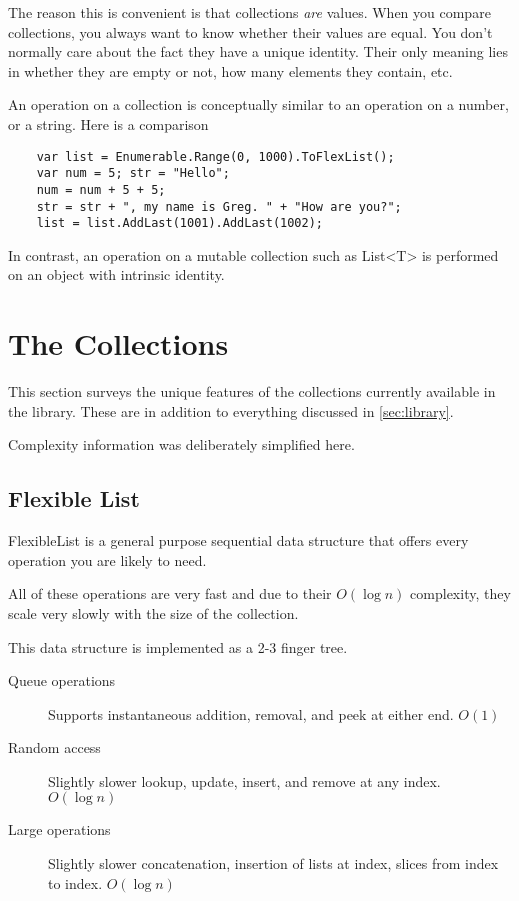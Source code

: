 \documentclass[]{article}
\begin{document}
The reason this is convenient is that collections \emph{are} values. When you compare collections, you always want to know whether their values are equal. You don't normally care about the fact they have a unique identity. Their only meaning lies in whether they are empty or not, how many elements they contain, etc.

An operation on a collection is conceptually similar to an operation on a number, or a string. Here is a comparison

\begin{lstlisting}
	var list = Enumerable.Range(0, 1000).ToFlexList();
	var num = 5; str = "Hello";
	num = num + 5 + 5; 
	str = str + ", my name is Greg. " + "How are you?";
	list = list.AddLast(1001).AddLast(1002);
\end{lstlisting}

In contrast, an operation on a mutable collection such as List<T> is performed on an object with intrinsic identity.

\section{The Collections}\label{sec:collections}
This section surveys the unique features of the collections currently available in the library. These are in addition to everything discussed in \cref{sec:library}.

Complexity information was deliberately simplified here.
\subsection{Flexible List}\label{sec:xlist}
FlexibleList is a general purpose sequential data structure that offers every operation you are likely to need.

All of these operations are very fast and due to their $O(\log n)$ complexity, they scale very slowly with the size of the collection. 

This data structure is implemented as a 2-3 finger tree.
\begin{description}
	\item[Queue operations] Supports instantaneous addition, removal, and peek at either end. $O(1)$
	\item[Random access] Slightly slower lookup, update, insert, and remove at any index. $O(\log n)$
	\item[Large operations] Slightly slower concatenation, insertion of lists at index, slices from index to index. $O(\log n)$
\end{description}
\end{document}
